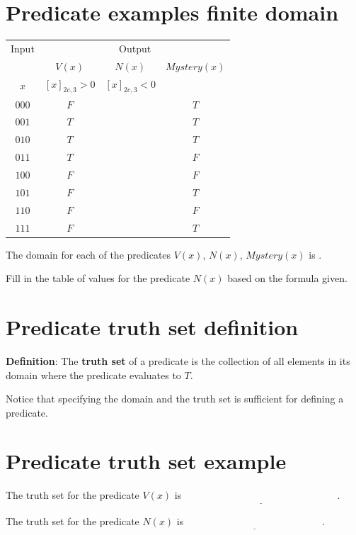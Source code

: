 \documentclass[12pt, oneside]{article}
\begin{document}
\section*{Predicate examples finite domain}


\begin{center}
    \begin{tabular}{c||c|c|c}
    Input & \multicolumn{3}{c}{Output} \\
    &$V(x)$ & $N(x)$ & $Mystery(x)$\\
    $x$ & $[x]_{2c,3} > 0$ & $[x]_{2c,3} < 0$& \\
    \hline
    $000$  & $F$ & & $T$\\
    $001$  & $T$ & & $T$\\
    $010$  & $T$ & & $T$\\
    $011$  & $T$ & & $F$\\
    $100$  & $F$ & & $F$\\
    $101$  & $F$ & & $T$\\
    $110$  & $F$ & & $F$\\
    $111$  & $F$ & & $T$\\
    \end{tabular}
    \end{center}
    
    The domain for each of the predicates $V(x)$, $N(x)$, $Mystery(x)$ is
    \underline{}.

    Fill in the table of values for the predicate $N(x)$ based on the formula given. \vfill
\section*{Predicate truth set definition}


{\bf Definition}: The {\bf truth  set} of a  predicate is the collection of all elements in its
domain where the predicate evaluates to $T$.

Notice that specifying the domain and the truth set is sufficient for defining
a predicate. \vfill
\section*{Predicate truth set example}


The truth set for the predicate $V(x)$ is $\underline{\phantom{\{ x ~\mid~ V(x) = T\} = \{ 001, 010, 011 \}}}$.

The truth set for the predicate $N(x)$ is $\underline{\phantom{\{ x ~\mid~ N(x) = T\} = \{ 101, 111 \}}}$.
\end{document}
